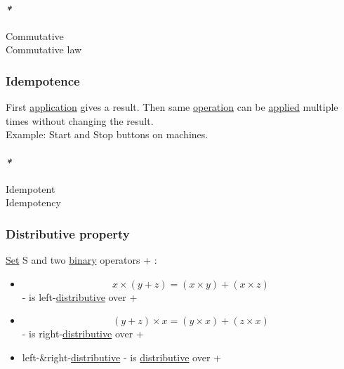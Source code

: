 \documentclass[11pt]{article}
\begin{document}
\paragraph{\emph{*}}
\label{sec:org13f4e60}

\label{orgcb2a02d}Commutative\\
\label{orge987731}Commutative law\\

\subsubsection{\label{orgd34ffb4}Idempotence}
\label{sec:org19f8ef9}
First \hyperref[orged2f814]{application} gives a result. Then same \hyperref[org87d485b]{operation} can be \hyperref[org848eb1f]{applied} multiple times without changing the result.\\
Example: Start and Stop buttons on machines.\\

\paragraph{\emph{*}}
\label{sec:org96298e9}

\label{org57b81e3}Idempotent\\
\label{org5f4abe3}Idempotency\\

\subsubsection{\label{orga7a3fd2}Distributive property}
\label{sec:org7bed22b}
\hyperref[orgbed80ba]{Set} S and two \hyperref[orgee106ab]{binary} operators + \texttimes{}:\\

\begin{itemize}
\item $$ x \times (y + z) = (x \times y) + (x \times z) $$ - \texttimes{} is left-\hyperref[org49b5544]{distributive} over +\\
\item $$ (y + z) \times x = (y \times x) + (z \times x) $$ - \texttimes{} is right-\hyperref[org49b5544]{distributive} over +\\
\item left-\&right-\hyperref[org49b5544]{distributive} - \texttimes{} is \hyperref[org49b5544]{distributive} over +\\
\end{itemize}
\end{document}
